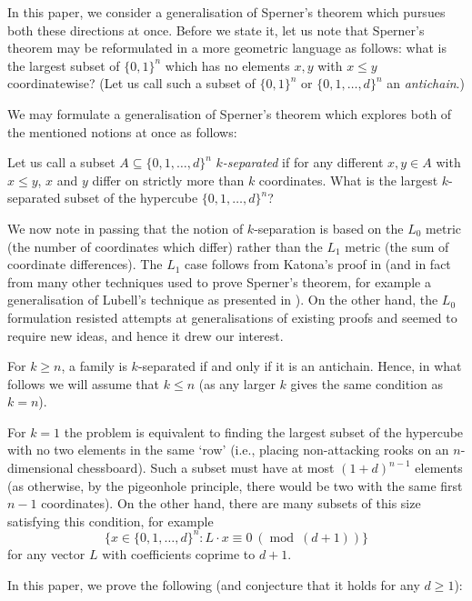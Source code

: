 \documentclass[11pt, reqno]{amsart}
\theoremstyle{remark}
\numberwithin{equation}{section}
\newcommand{\thehypercube}{\{0, 1, \ldots, d\}^n}
\newcommand\modd{\operatorname{mod}}
\begin{document}
In this paper, we consider a generalisation of Sperner's theorem which pursues both these directions at once. Before we state it, let us note that Sperner's theorem may be reformulated in a more geometric language as follows: what is the largest subset of $\{0, 1\}^n$ which has no elements $x, y$ with $x \leqslant y$ coordinatewise? (Let us call such a subset of $\{0, 1\}^n$ or $\thehypercube$ an \emph{antichain}.)

We may formulate a generalisation of Sperner's theorem which explores both of the mentioned notions at once as follows:

Let us call a subset $A \subseteq \thehypercube$ \emph{$k$-separated} if for any different $x, y \in A$ with $x \leqslant y$, $x$ and $y$ differ on strictly more than $k$ coordinates. What is the largest $k$-separated subset of the hypercube $\thehypercube$?

We now note in passing that the notion of $k$-separation is based on the $L_0$ metric (the number of coordinates which differ) rather than the $L_1$ metric (the sum of coordinate differences). The $L_1$ case follows from Katona's proof in \cite{katona} (and in fact from many other techniques used to prove Sperner's theorem, for example a generalisation of Lubell's technique \cite{lubell} as presented in \cite{nagys}). On the other hand, the $L_0$ formulation resisted attempts at generalisations of existing proofs and seemed to require new ideas, and hence it drew our interest.

For $k \geqslant n$, a family is $k$-separated if and only if it is an antichain. Hence, in what follows we will assume that $k \leqslant n$ (as any larger $k$ gives the same condition as $k=n$). 

For $k=1$ the problem is equivalent to finding the largest subset of the hypercube with no two elements in the same `row' (i.e., placing non-attacking rooks on an $n$-dimensional chessboard). Such a subset must have at most $(1+d)^{n-1}$ elements (as otherwise, by the pigeonhole principle, there would be two with the same first $n-1$ coordinates). On the other hand, there are many subsets of this size satisfying this condition, for example
\begin{equation*}
    \big\{ x \in \thehypercube: L \cdot x \equiv 0 \ (\modd \ (d+1)) \big\}
\end{equation*}
for any vector $L$ with coefficients coprime to $d+1$.

In this paper, we prove the following (and conjecture that it holds for any $d \geqslant 1$):
\end{document}
